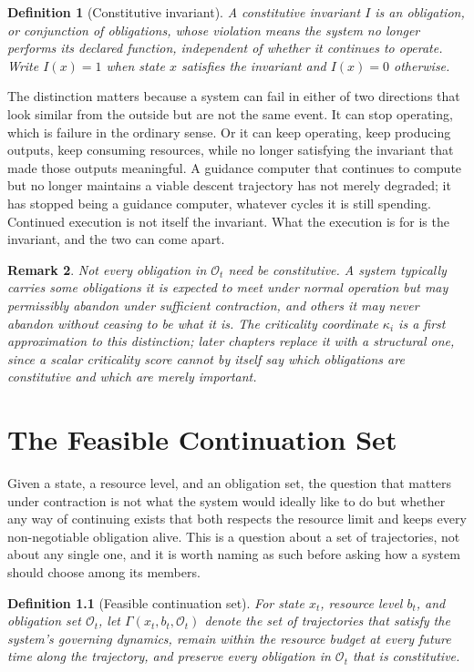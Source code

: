 \documentclass[11pt]{report}
\newtheorem{definition}{Definition}[chapter]
\newtheorem{remark}[definition]{Remark}
\begin{document}
\begin{definition}[Constitutive invariant]
A constitutive invariant $I$ is an obligation, or conjunction of obligations, whose violation means the system no longer performs its declared function, independent of whether it continues to operate. Write $I(x) = 1$ when state $x$ satisfies the invariant and $I(x) = 0$ otherwise.
\end{definition}

The distinction matters because a system can fail in either of two directions that look similar from the outside but are not the same event. It can stop operating, which is failure in the ordinary sense. Or it can keep operating, keep producing outputs, keep consuming resources, while no longer satisfying the invariant that made those outputs meaningful. A guidance computer that continues to compute but no longer maintains a viable descent trajectory has not merely degraded; it has stopped being a guidance computer, whatever cycles it is still spending. Continued execution is not itself the invariant. What the execution is for is the invariant, and the two can come apart.

\begin{remark}
Not every obligation in $\mathcal O_t$ need be constitutive. A system typically carries some obligations it is expected to meet under normal operation but may permissibly abandon under sufficient contraction, and others it may never abandon without ceasing to be what it is. The criticality coordinate $\kappa_i$ is a first approximation to this distinction; later chapters replace it with a structural one, since a scalar criticality score cannot by itself say which obligations are constitutive and which are merely important.
\end{remark}

\chapter{The Feasible Continuation Set}

Given a state, a resource level, and an obligation set, the question that matters under contraction is not what the system would ideally like to do but whether any way of continuing exists that both respects the resource limit and keeps every non-negotiable obligation alive. This is a question about a set of trajectories, not about any single one, and it is worth naming as such before asking how a system should choose among its members.

\begin{definition}[Feasible continuation set]
For state $x_t$, resource level $b_t$, and obligation set $\mathcal O_t$, let $\Gamma(x_t, b_t, \mathcal O_t)$ denote the set of trajectories that satisfy the system's governing dynamics, remain within the resource budget at every future time along the trajectory, and preserve every obligation in $\mathcal O_t$ that is constitutive.
\end{definition}
\end{document}

